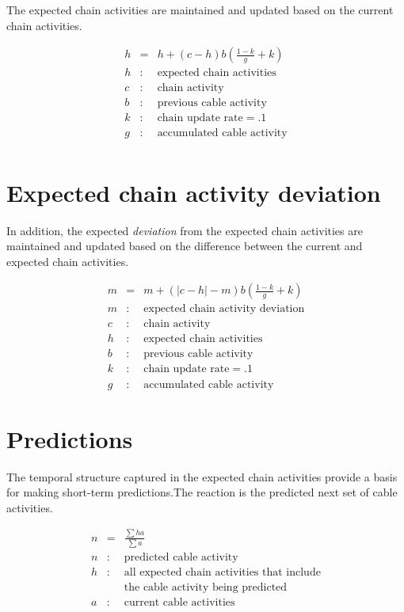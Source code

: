 \documentclass[oneside,twocolumn]{article}
\begin{document}
The expected chain activities are maintained and updated based on the current chain activities. 

\begin{eqnarray*}
h &= & h + (c-h)b \left ( \frac{1 - k}{g} + k \right)\\ 
h &:& \mbox{expected chain activities} \\
c &:& \mbox{chain activity} \\
b &:& \mbox{previous cable activity} \\
k &:& \mbox{chain update rate} = .1 \\
g &:& \mbox{accumulated cable activity} \\
\end{eqnarray*}

\section*{\color{copper} Expected chain activity deviation}

In addition, the expected {\em deviation} from the expected chain activities are maintained and updated based on the difference between the current and expected chain activities. 

\begin{eqnarray*}
m &= & m + (|c-h|-m) b \left ( \frac{1 - k}{g} + k \right)\\ 
m &:& \mbox{expected chain activity deviation} \\
c &:& \mbox{chain activity} \\
h &:& \mbox{expected chain activities} \\
b &:& \mbox{previous cable activity} \\
k &:& \mbox{chain update rate} = .1 \\
g &:& \mbox{accumulated cable activity}
\end{eqnarray*}

\section*{\color{copper} Predictions}

The temporal structure captured in the expected chain activities provide a basis for making short-term predictions.The reaction is the predicted next set of cable activities. 

\begin{eqnarray*}
n &= & \frac{\sum h a}{\sum{a}} \\
n &:& \mbox{predicted cable activity} \\
h &:& \mbox{all expected chain activities that include} \\
&& \mbox{the cable activity being predicted} \\
a &:& \mbox{current cable activities}
\end{eqnarray*}
\end{document}
